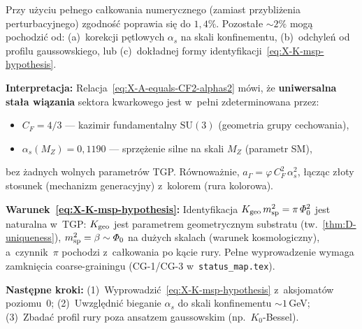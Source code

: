 \begin{proposition}[Skasowanie $\PhiZero$
  i~relacja $\mathcal{A} = C_F^2\,\alpha_s^2$ (v47b)]
\noindent
Przy u\.zyciu pe\l{}nego ca\l{}kowania numerycznego (zamiast przybli\.zenia
perturbacyjnego) zgodno\'s\'c poprawia si\k{e} do $1{,}4\%$.
Pozosta\l{}e $\sim\!2\%$ mog\k{a} pochodzi\'c od:
(a)~korekcji p\k{e}tlowych $\alpha_s$ na skali konfinementu,
(b)~odchyle\'n od profilu gaussowskiego,
lub (c)~dok\l{}adnej formy identyfikacji~\eqref{eq:X-K-msp-hypothesis}.

\medskip\noindent
\textbf{Interpretacja:}
Relacja~\eqref{eq:X-A-equals-CF2-alphas2} m\'owi, \.ze
\textbf{uniwersalna sta\l{}a wi\k{a}zania} sektora kwarkowego jest
w~pe\l{}ni zdeterminowana przez:
\begin{itemize}[nosep]
  \item $C_F = 4/3$ --- kazimir fundamentalny $\mathrm{SU}(3)$
    (geometria grupy cechowania),
  \item $\alpha_s(M_Z) = 0{,}1190$ --- sprz\k{e}\.zenie silne
    na skali $M_Z$ (parametr SM),
\end{itemize}
bez \.zadnych wolnych parametr\'ow TGP.
R\'ownowa\.znie, $a_\Gamma = \varphi\,C_F^2\,\alpha_s^2$, \l{}\k{a}cz\k{a}c
z\l{}oty stosunek (mechanizm generacyjny) z~kolorem (rura kolorowa).

\medskip\noindent
\textbf{Warunek~\eqref{eq:X-K-msp-hypothesis}:}
Identyfikacja $K_{\rm geo}\,m_{\rm sp}^2 = \pi\,\varPhi_0^2$ jest
naturalna w~TGP: $K_{\rm geo}$ jest parametrem geometrycznym substratu
(tw.~\ref{thm:D-uniqueness}), $m_{\rm sp}^2 = \beta \sim \varPhi_0$ na du\.zych
skalach (warunek kosmologiczny), a~czynnik~$\pi$ pochodzi
z~ca\l{}kowania po k\k{a}cie rury.
Pe\l{}ne wyprowadzenie wymaga zamkni\k{e}cia coarse-grainingu
(CG-1/CG-3 w~\texttt{status\_map.tex}).

\medskip\noindent
\textbf{Nast\k{e}pne kroki:}
(1)~Wyprowadzi\'c~\eqref{eq:X-K-msp-hypothesis}
z~aksjomat\'ow poziomu~0;
(2)~Uwzgl\k{e}dni\'c bieganie $\alpha_s$ do skali konfinementu
$\sim 1$\,GeV;
(3)~Zbada\'c profil rury poza ansatzem gaussowskim (np.\ $K_0$-Bessel).
\end{proposition}

